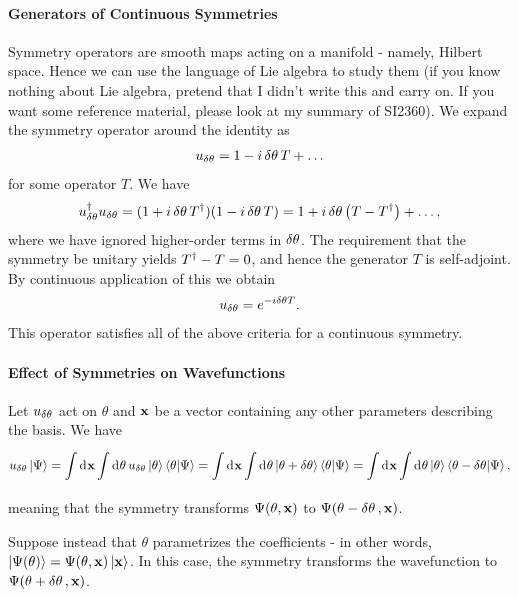 \paragraph{Generators of Continuous Symmetries}
Symmetry operators are smooth maps acting on a manifold - namely, Hilbert space. Hence we can use the language of Lie algebra to study them (if you know nothing about Lie algebra, pretend that I didn't write this and carry on. If you want some reference material, please look at my summary of SI2360). We expand the symmetry operator around the identity as
\begin{align*}
	u_{\var{\theta}} = 1 - i\var{\theta}T + \dots
\end{align*}
for some operator $T$. We have
\begin{align*}
	u_{\var{\theta}}^{\dagger}u_{\var{\theta}} = (1 + i\var{\theta}T^{\dagger})(1 - i\var{\theta}T) = 1 + i\var{\theta}\left(T - T^{\dagger}\right) + \dots,
\end{align*}
where we have ignored higher-order terms in $\var{\theta}$. The requirement that the symmetry be unitary yields $T^{\dagger} - T = 0$, and hence the generator $T$ is self-adjoint. By continuous application of this we obtain
\begin{align*}
	u_{\var{\theta}} = e^{-i\var{\theta}T}.
\end{align*}
This operator satisfies all of the above criteria for a continuous symmetry.

\paragraph{Effect of Symmetries on Wavefunctions}
Let $u_{\var{\theta}}$ act on $\theta$ and $\vb{x}$ be a vector containing any other parameters describing the basis. We have
\begin{align*}
	u_{\var{\theta}}\ket{\Psi} = \int\limits_{}^{}\dd[]{\vb{x}}\int\limits_{}^{}\dd[]{\theta}u_{\var{\theta}}\ket{\theta}\braket{\theta}{\Psi} = \int\limits_{}^{}\dd[]{\vb{x}}\int\limits_{}^{}\dd[]{\theta}\ket{\theta + \var{\theta}}\braket{\theta}{\Psi} = \int\limits_{}^{}\dd[]{\vb{x}}\int\limits_{}^{}\dd[]{\theta}\ket{\theta}\braket{\theta - \var{\theta}}{\Psi},
\end{align*}
meaning that the symmetry transforms $\Psi(\theta, \vb{x})$ to $\Psi(\theta - \var{\theta}, \vb{x})$.

Suppose instead that $\theta$ parametrizes the coefficients - in other words, $\ket{\Psi(\theta)} = \Psi(\theta, \vb{x})\ket{\vb{x}}$. In this case, the symmetry transforms the wavefunction to $\Psi(\theta + \var{\theta}, \vb{x})$.

